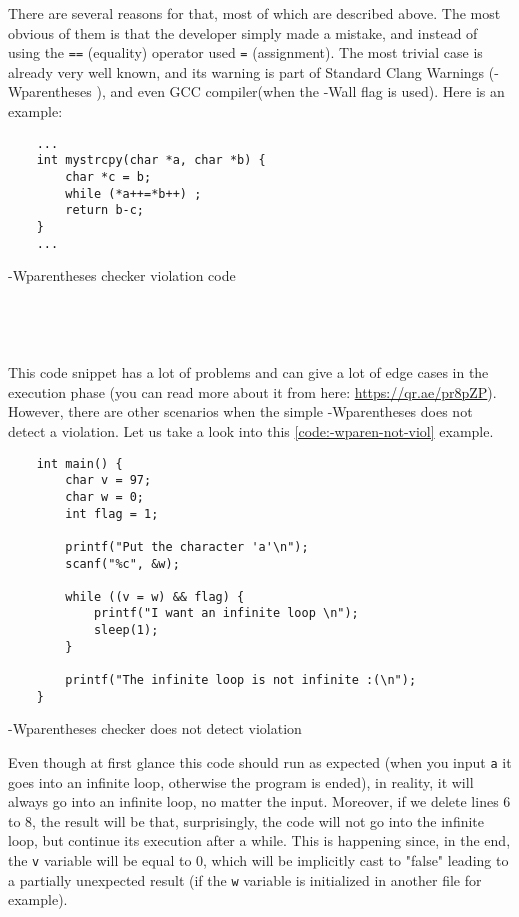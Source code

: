 There are several reasons for that, most of which are described above. The most obvious of them is that the developer simply made a mistake, and instead of using the  \lstinline{==} (equality) operator used \lstinline{=} (assignment). The most trivial case is already very well known, and its warning is part of Standard Clang Warnings (-Wparentheses ), and even GCC compiler(when the -Wall flag is used). Here is an example:

\begin{listing}[h]
\begin{verbatim}
    ...
    int mystrcpy(char *a, char *b) { 
        char *c = b; 
        while (*a++=*b++) ; 
        return b-c; 
    } 
    ... 
\end{verbatim}
\caption{-Wparentheses checker violation code}
\label{code:-wparen-viol}
\end{listing}

\paragraph{\\ 
\\}
This code snippet has a lot of problems and can give a lot of edge cases in the execution phase (you can read more about it from here: \url{https://qr.ae/pr8pZP}). However, there are other scenarios when the simple -Wparentheses does not detect a violation. Let us take a look into this \ref{code:-wparen-not-viol} example.

\begin{listing}[!h]
\begin{verbatim}
    int main() {
        char v = 97;
        char w = 0;
        int flag = 1;
    
        printf("Put the character 'a'\n");
        scanf("%c", &w);
    
        while ((v = w) && flag) {
            printf("I want an infinite loop \n");
            sleep(1);
        }
    
        printf("The infinite loop is not infinite :(\n");
    }
\end{verbatim}
\caption{-Wparentheses checker does not detect violation}
\label{code:-wparen-not-viol}
\end{listing}

Even though at first glance this code should run as expected (when you input \lstinline{a} it goes into an infinite loop, otherwise the program is ended), in reality, it will always go into an infinite loop, no matter the input. Moreover, if we delete lines 6 to 8, the result will be that, surprisingly, the code will not go into the infinite loop, but continue its execution after a while. This is happening since, in the end, the \lstinline{v} variable will be equal to 0, which will be implicitly cast to "false" leading to a partially unexpected result (if the \lstinline{w} variable is initialized in another file for example). 


